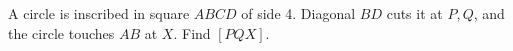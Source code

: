 A circle is inscribed in square $ABCD$ of side 4. Diagonal $BD$ cuts it at $P,Q$, and the circle touches $AB$ at $X$. Find $[PQX]$.
